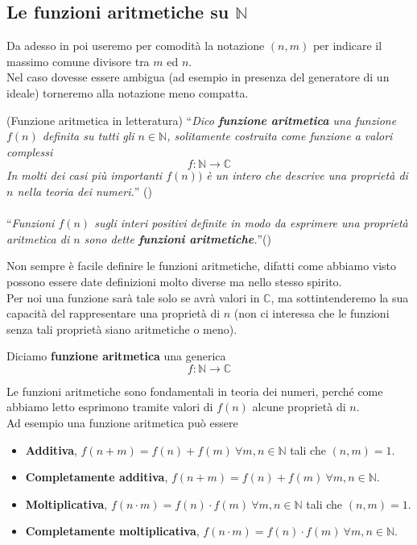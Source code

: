 \subsection{Le funzioni aritmetiche su $\mathbb{N}$}
Da adesso in poi useremo per comodità la notazione $(n,m)$ per indicare il massimo comune divisore tra $m$ ed $n$.\\ Nel caso dovesse essere ambigua (ad esempio in presenza del generatore di un ideale) torneremo alla notazione meno compatta.
\begin{definizione}(Funzione aritmetica in letteratura) 
	\enquote{\textit{Dico \textbf{funzione aritmetica} una funzione $f(n)$ definita su tutti gli $n \in \mathbb{N}$, solitamente costruita come funzione a valori complessi}
	\begin{equation*}
	f:\mathbb{N}\longrightarrow\mathbb{C}
	\end{equation*}
	\textit{In molti dei casi più importanti $f(n))$ è un intero che descrive una proprietà di $n$ nella teoria dei numeri.}} (\cite[capitolo 8, pagina 143]{J12}) \\ \\
	\enquote{\textit{Funzioni $f(n)$ sugli interi positivi definite in modo da esprimere una proprietà aritmetica di $n$ sono dette \textbf{funzioni aritmetiche}.}}(\cite[capitolo 16, pagina 133; quarta edizione]{H08})%
\end{definizione}
Non sempre è facile definire le funzioni aritmetiche, difatti come abbiamo visto possono essere date definizioni molto diverse ma nello stesso spirito. \\ Per noi una funzione sarà tale solo se avrà valori in $\mathbb{C}$, ma sottintenderemo la sua capacità del rappresentare una proprietà di $n$ (non ci interessa che le funzioni senza tali proprietà siano aritmetiche o meno). 
\begin{definizione}
	Diciamo \textbf{funzione aritmetica} una generica
	\begin{equation*}
	f:\mathbb{N}\longrightarrow\mathbb{C}
	\end{equation*}
\end{definizione}
Le funzioni aritmetiche sono fondamentali in teoria dei numeri, perché come abbiamo letto esprimono tramite valori di $f(n)$ alcune proprietà di $n$. \\ Ad esempio una funzione aritmetica può essere
\begin{itemize}
	\item \textbf{Additiva}, $f(n+m)=f(n)+f(m) \ \forall m,n \in \mathbb{N}$ tali che $(n,m)=1$.
	\item \textbf{Completamente additiva}, $f(n+m)=f(n)+f(m) \ \forall m,n \in \mathbb{N}$.
	\item \textbf{Moltiplicativa}, $f(n\cdot m)=f(n)\cdot f(m) \ \forall m,n \in \mathbb{N}$ tali che $(n,m)=1$.
	\item \textbf{Completamente moltiplicativa}, $f(n\cdot m)=f(n)\cdot f(m) \ \forall m,n \in \mathbb{N}$.
\end{itemize}
